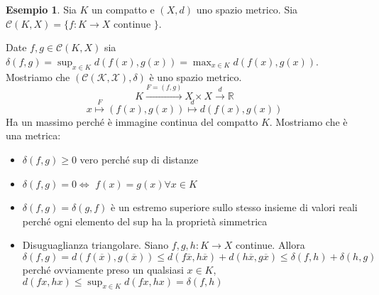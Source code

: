 \documentclass{article}
\newcounter{theo}[section]\setcounter{theo}{0}
\newcounter{excounter}[section]\setcounter{excounter}{0}
\theoremstyle{plain}
\theoremstyle{definition}
\newtheorem{example}[excounter]{Esempio}
\theoremstyle{remark}
\begin{document}
\begin{example}
    Sia \(K\) un compatto e \((X, d)\) uno spazio metrico. Sia \(\mathcal{C}(K,
    X) = \{f : K \to X \text{ continue }\} \). 

    Date \(f, g \in \mathcal{C}(K, X)\) sia \(\delta(f, g) = \sup_{x \in K}
    d(f(x), g(x)) = \max_{x \in K} d(f(x), g(x))\). Mostriamo che \((\mathcal{C(K, X), \delta})\) è uno spazio
    metrico. 
    \[
        K \stackrel{F = (f, g)}{\longrightarrow } X \times X \stackrel{d}{\to } \mathbb{R}
    \]
    \[
        x \stackrel{F}{ \mapsto } (f(x), g(x)) \stackrel{d}{ \mapsto } d(f(x), g(x))
    \]
    Ha un massimo perché è immagine continua del compatto \(K\). Mostriamo che è
    una metrica:
\begin{itemize}[label = --]
    \item \(\delta(f, g) \ge 0\) vero perché sup di distanze 
    \item \(\delta(f,g) = 0 \iff\) \(f(x) = g(x) \forall x \in K\) 
    \item \(\delta(f, g) = \delta(g,f)\) è un estremo superiore sullo stesso
        insieme di valori reali perché ogni elemento del sup ha la proprietà
        simmetrica
    \item Disuguaglianza triangolare. Siano \(f, g, h : K \to X\) continue.
        Allora \(\delta(f, g) = d(f(\overline{x}), g(\overline{x})) \le
        d(f\overline{x}, h\overline{x}) + d(h\overline{x}, g\overline{x}) \le
        \delta(f, h) + \delta(h, g)\) perché ovviamente preso un qualsiasi \(x
        \in K\), \(d(fx, hx) \le \sup_{x \in K}d(fx, hx) = \delta(f, h)\) 
\end{itemize}
 
\end{example}
\end{document}
